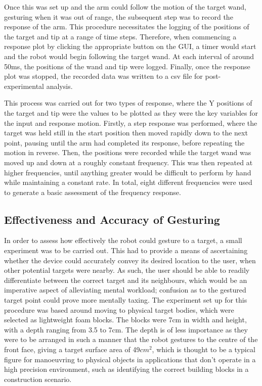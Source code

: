 \documentclass[11pt]{article}
\begin{document}
Once this was set up and the arm could follow the motion of the target wand, gesturing when it was out of range, the subsequent step was to record the response of the arm. This procedure necessitates the logging of the positions of the target and tip at a range of time steps. Therefore, when commencing a response plot by clicking the appropriate button on the GUI, a timer would start and the robot would begin following the target wand. At each interval of around 50ms, the positions of the wand and tip were logged. Finally, once the response plot was stopped, the recorded data was written to a csv file for post-experimental analysis. 

This process was carried out for two types of response, where the Y positions of the target and tip were the values to be plotted as they were the key variables for the input and response motion. Firstly, a step response was performed, where the target was held still in the start position then moved rapidly down to the next point, pausing until the arm had completed its response, before repeating the motion in reverse. Then, the positions were recorded while the target wand was moved up and down at a roughly constant frequency. This was then repeated at higher frequencies, until anything greater would be difficult to perform by hand while maintaining a constant rate. In total, eight different frequencies were used to generate a basic assessment of the frequency response.


\subsection{Effectiveness and Accuracy of Gesturing}

In order to assess how effectively the robot could gesture to a target, a small experiment was to be carried out. This had to provide a means of ascertaining whether the device could accurately convey its desired location to the user, when other potential targets were nearby. As such, the user should be able to readily differentiate between the correct target and its neighbours, which would be an imperative aspect of alleviating mental workload; confusion as to the gestured target point could prove more mentally taxing. The experiment set up for this procedure was based around moving to physical target bodies, which were selected as lightweight foam blocks. The blocks were 7cm in width and height, with a depth ranging from 3.5 to 7cm. The depth is of less importance as they were to be arranged in such a manner that the robot gestures to the centre of the front face, giving a target surface area of 49$cm^{2}$, which is thought to be a typical figure for manoeuvring to physical objects in applications that don't operate in a high precision environment, such as identifying the correct building blocks in a construction scenario.
\end{document}
